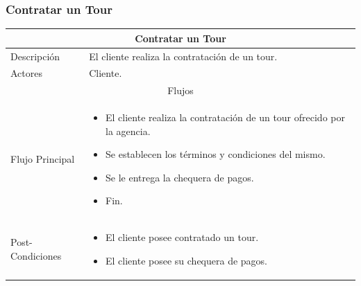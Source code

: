 \documentclass[12pt,a4paper]{article}
\newenvironment{myitemize}
{\begin{itemize}[leftmargin=*,noitemsep,topsep=0pt]}{\end{itemize}}
\newenvironment{caseuse}
{\begin{center}\begin{tabular}{|l|p{10cm}|}}{\end{tabular}\end{center}}
\begin{document}
		\subsubsection{Contratar un Tour}

			\begin{caseuse}
				\hline
				\multicolumn{2}{|c|}{Contratar un Tour} \\ \hline

				Descripción &  El cliente realiza la contratación de un tour.\\ \hline

				Actores &  Cliente.\\ \hline

				\multicolumn{2}{|c|}{Flujos} \\ \hline

				Flujo Principal &
					\begin{myitemize}
						\item El cliente realiza la contratación de un tour ofrecido por la agencia.
						\item Se establecen los términos y condiciones del mismo.
						\item Se le entrega la chequera de pagos.
						\item Fin.
					\end{myitemize} \\ \hline

				Post-Condiciones &
					\begin{myitemize}
						\item El cliente posee contratado un tour.
						\item El cliente posee su chequera de pagos.
					\end{myitemize}\\ \hline
			\end{caseuse}
\end{document}
